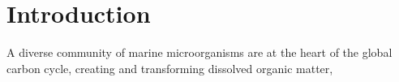 \chapter{Introduction}

A diverse community of marine microorganisms are at the heart of the global carbon cycle, creating and transforming dissolved organic matter, 













